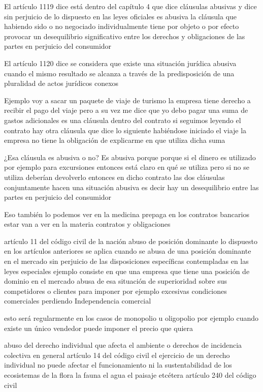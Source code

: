 \documentclass[12pt]{book}
\begin{document}
El artículo 1119 dice está dentro del capítulo 4 que dice cláusulas abusivas y dice sin perjuicio de lo dispuesto en las leyes oficiales es abusiva la cláusula que habiendo sido o no negociado individualmente tiene por objeto o por efecto provocar un desequilibrio significativo entre los derechos y obligaciones de las partes en perjuicio del consumidor

El artículo 1120 dice se considera que existe una situación jurídica abusiva cuando el mismo resultado se alcanza a través de la predisposición de una pluralidad de actos jurídicos conexos

Ejemplo voy a sacar un paquete de viaje de turismo la empresa tiene derecho a recibir el pago del viaje pero a su vez me dice que yo debo pagar una suma de gastos adicionales es una cláusula dentro del contrato si seguimos leyendo el contrato hay otra cláusula que dice lo siguiente habiéndose iniciado el viaje la empresa no tiene la obligación de explicarme en que utiliza dicha suma

¿Esa cláusula es abusiva o no?
Es abusiva porque porque si el dinero es utilizado por ejemplo para excursiones entonces está claro en qué se utiliza pero si no se utiliza deberían devolverlo
entonces en dicho contrato las dos cláusulas conjuntamente hacen una situación abusiva es decir hay un desequilibrio entre las partes en perjuicio del consumidor

Eso también lo podemos ver en la medicina prepaga en los contratos bancarios estar van a ver en la materia contratos y obligaciones

artículo 11 del código civil de la nación abuso de posición dominante lo dispuesto en los artículos anteriores se aplica cuando se abusa de una posición dominante en el mercado sin perjuicio de las disposiciones específicas contempladas en las leyes especiales ejemplo consiste en que una empresa que tiene una posición de dominio en el mercado abusa de esa situación de superioridad sobre sus competidores o clientes para imponer por ejemplo excesivas condiciones comerciales perdiendo Independencia comercial

esto será regularmente en los casos de monopolio u oligopolio por ejemplo cuando existe un único vendedor puede imponer el precio que quiera

abuso del derecho individual que afecta el ambiente o derechos de incidencia colectiva en general artículo 14 del código civil el ejercicio de un derecho individual no puede afectar el funcionamiento ni la sustentabilidad de los ecosistemas de la flora la fauna el agua el paisaje etcétera artículo 240 del código civil
\end{document}
